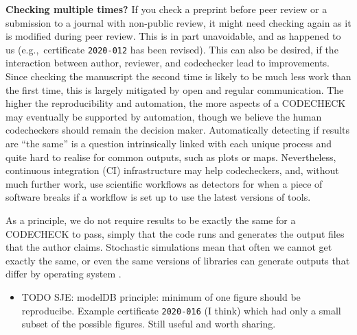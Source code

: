 \documentclass[12pt]{article}
\begin{document}
\textbf{Checking multiple times?} If you check a preprint before peer
review or a submission to a journal with non-public review, it might
need checking again as it is modified during peer review.  This is in
part unavoidable, and as happened to us (e.g.,~certificate \texttt{2020-012}
\cite{cert-2020-012} has been revised). This can also be desired, if
the interaction between author, reviewer, and codechecker lead to
improvements.  Since checking the manuscript the second time is likely
to be much less work than the first time, this is largely mitigated by
open and regular communication.  The higher the reproducibility and
automation, the more aspects of a CODECHECK may eventually be
supported by automation, though we believe the human codecheckers
should remain the decision maker.  Automatically detecting if results
are ``the same'' is a question intrinsically linked with each unique
process and quite hard to realise for common outputs, such as plots or
maps.  Nevertheless, continuous integration (CI) infrastructure may
help codecheckers, and, without much further work, use scientific
workflows as detectors for when a piece of software breaks if a
workflow is set up to use the latest versions of tools.

As a principle, we do not require results to be exactly the same for a
CODECHECK to pass, simply that the code runs and generates the output
files that the author claims. Stochastic simulations mean that often
we cannot get exactly the same, or even the same versions of libraries
can generate outputs that differ by operating system
\cite{Gronenschild2012-pp}.

\begin{itemize}
\item TODO SJE: modelDB principle: minimum of one figure should be reproducibe.
  Example certificate \texttt{2020-016} (I think) which had only a small subset
  of the possible figures. Still useful and worth sharing.
\end{itemize}
\end{document}
